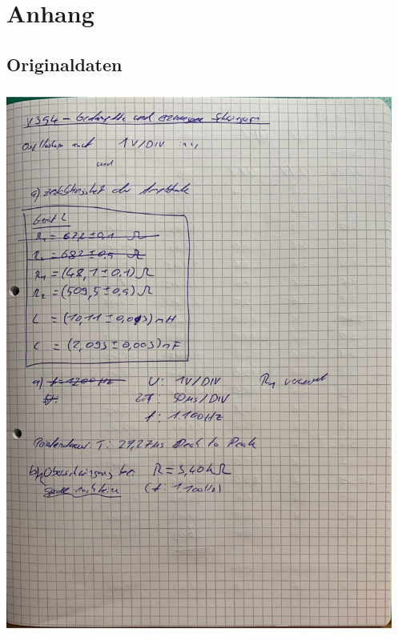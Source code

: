 \section{Anhang}
\label{sec:Anhang}
\subsection{Originaldaten}
\includegraphics[height=18cm]{content/Originaldaten/Originaldaten_1.pdf}
\newpage
